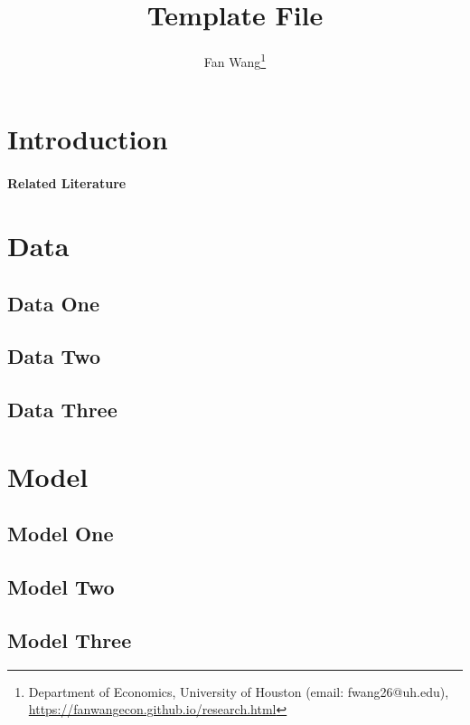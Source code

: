 \documentclass[12pt,english]{article}
\begin{document}
	
\title{Template File}
\author{Fan Wang\thanks{Department of Economics, University of Houston (email: fwang26@uh.edu), \url{https://fanwangecon.github.io/research.html}}}
\maketitle
\begin{abstract}
\abstractB
\end{abstract}
\vfill
\pagebreak{}

\section{Introduction}

\paragraph{Related Literature}


\section{Data}
\subsection{Data One}

\subsection{Data Two}

\subsection{Data Three}


\section{Model}
\subsection{Model One}

\subsection{Model Two}

\subsection{Model Three}

\end{document}
